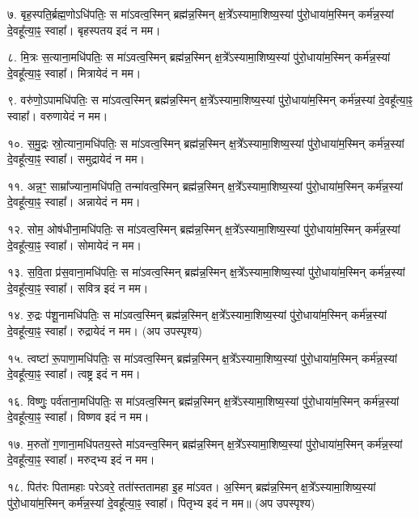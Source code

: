 ७. बृह॒स्पति॒र्ब्रह्म॒णोऽधि॑पतिः॒ स मा॑ऽवत्व॒स्मिन् ब्रह्म॑न्न॒स्मिन् क्ष॒त्रे᳚ऽस्यामा॒शिष्य॒स्यां पु॑रो॒धाया॑म॒स्मिन् कर्म॑न्न॒स्यां दे॒वहू᳚त्या॒ꣴ॒ स्वाहा᳚। बृहस्पतय इदं न मम।

८. मि॒त्रः स॒त्याना॒मधि॑पतिः॒ स मा॑ऽवत्व॒स्मिन् ब्रह्म॑न्न॒स्मिन् क्ष॒त्रे᳚ऽस्यामा॒शिष्य॒स्यां पु॑रो॒धाया॑म॒स्मिन् कर्म॑न्न॒स्यां दे॒वहू᳚त्या॒ꣴ॒ स्वाहा᳚। मित्रायेदं न मम।

९. वरु॑णो॒ऽपामधि॑पतिः॒ स मा॑ऽवत्व॒स्मिन् ब्रह्म॑न्न॒स्मिन् क्ष॒त्रे᳚ऽस्यामा॒शिष्य॒स्यां पु॑रो॒धाया॑म॒स्मिन् कर्म॑न्न॒स्यां दे॒वहू᳚त्या॒ꣴ॒ स्वाहा᳚। वरुणायेदं न मम।

१०. स॒मु॒द्रः स्रो॒त्याना॒मधि॑पतिः॒ स मा॑ऽवत्व॒स्मिन् ब्रह्म॑न्न॒स्मिन् क्ष॒त्रे᳚ऽस्यामा॒शिष्य॒स्यां पु॑रो॒धाया॑म॒स्मिन् कर्म॑न्न॒स्यां दे॒वहू᳚त्या॒ꣴ॒ स्वाहा᳚। समुद्रायेदं न मम।

११. अन्न॒ꣳ॒ साम्रा᳚ज्याना॒मधि॑पति॒ तन्मा॑वत्व॒स्मिन् ब्रह्म॑न्न॒स्मिन् क्ष॒त्रे᳚ऽस्यामा॒शिष्य॒स्यां पु॑रो॒धाया॑म॒स्मिन् कर्म॑न्न॒स्यां दे॒वहू᳚त्या॒ꣴ॒ स्वाहा᳚। अन्नायेदं न मम।

१२. सोम॒ ओष॑धीना॒मधि॑पतिः॒ स मा॑ऽवत्व॒स्मिन् ब्रह्म॑न्न॒स्मिन् क्ष॒त्रे᳚ऽस्यामा॒शिष्य॒स्यां पु॑रो॒धाया॑म॒स्मिन् कर्म॑न्न॒स्यां दे॒वहू᳚त्या॒ꣴ॒ स्वाहा᳚। सोमायेदं न मम।

१३. स॒वि॒ता प्र॑स॒वाना॒मधि॑पतिः॒ स मा॑ऽवत्व॒स्मिन् ब्रह्म॑न्न॒स्मिन् क्ष॒त्रे᳚ऽस्यामा॒शिष्य॒स्यां पु॑रो॒धाया॑म॒स्मिन् कर्म॑न्न॒स्यां दे॒वहू᳚त्या॒ꣴ॒ स्वाहा᳚। सवित्र इदं न मम।

१४. रु॒द्रः प॑शू॒नामधि॑पतिः॒ स मा॑ऽवत्व॒स्मिन् ब्रह्म॑न्न॒स्मिन् क्ष॒त्रे᳚ऽस्यामा॒शिष्य॒स्यां पु॑रो॒धाया॑म॒स्मिन् कर्म॑न्न॒स्यां दे॒वहू᳚त्या॒ꣴ॒ स्वाहा᳚। रुद्रायेदं न मम। (अप उपस्पृश्य)

१५. त्वष्टा॑ रू॒पाणा॒मधि॑पतिः॒ स मा॑ऽवत्व॒स्मिन् ब्रह्म॑न्न॒स्मिन् क्ष॒त्रे᳚ऽस्यामा॒शिष्य॒स्यां पु॑रो॒धाया॑म॒स्मिन् कर्म॑न्न॒स्यां दे॒वहू᳚त्या॒ꣴ॒ स्वाहा᳚। त्वष्ट्र इदं न मम।

१६. विष्णुः॒ पर्व॑ताना॒मधि॑पतिः॒ स मा॑ऽवत्व॒स्मिन् ब्रह्म॑न्न॒स्मिन् क्ष॒त्रे᳚ऽस्यामा॒शिष्य॒स्यां पु॑रो॒धाया॑म॒स्मिन् कर्म॑न्न॒स्यां दे॒वहू᳚त्या॒ꣴ॒ स्वाहा᳚। विष्णव इदं न मम।

१७. म॒रुतो॑ ग॒णाना॒मधि॑पतय॒स्ते मा॑ऽवन्त्व॒स्मिन् ब्रह्म॑न्न॒स्मिन् क्ष॒त्रे᳚ऽस्यामा॒शिष्य॒स्यां पु॑रो॒धाया॑म॒स्मिन् कर्म॑न्न॒स्यां दे॒वहू᳚त्या॒ꣴ॒ स्वाहा᳚। मरुद्भ्य इदं न मम।

१८. पित॑रः पितामहाः परेऽवरे॒ तता॑॑स्ततामहा इ॒ह मा॑ऽवत। अ॒स्मिन् ब्रह्म॑न्न॒स्मिन् क्ष॒त्रे᳚ऽस्यामा॒शिष्य॒स्यां पु॑रो॒धाया॑म॒स्मिन् कर्म॑न्न॒स्यां दे॒वहू᳚त्या॒ꣴ॒ स्वाहा᳚। पितृभ्य इदं न मम॥ (अप उपस्पृश्य)


